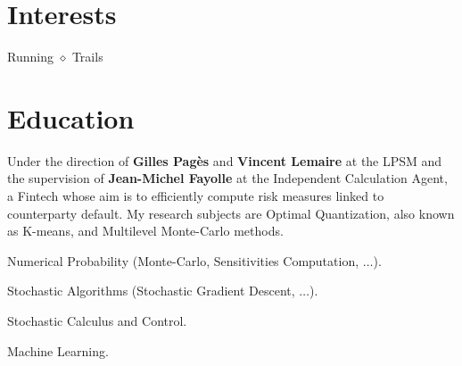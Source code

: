 \documentclass[]{deedy-resume-openfont}
\begin{document}
\begin{minipage}[t]{0.33\textwidth}

\vspace{\topsep}
\vspace{\topsep}
\section{Interests}
Running $\diamond$ Trails

%
%

\end{minipage}
\hfill
\begin{minipage}[t]{0.64\textwidth}



\section{Education}

Under the direction of \textbf{Gilles Pagès} and \textbf{Vincent Lemaire} at the LPSM and the supervision of \textbf{Jean-Michel Fayolle} at the Independent Calculation Agent, a Fintech whose aim is to efficiently compute risk measures linked to counterparty default. My research subjects are Optimal Quantization, also known as K-means, and Multilevel Monte-Carlo methods.
\sectionsep


\vspace{\topsep}
\begin{tightemize}
	\item Numerical Probability (Monte-Carlo, Sensitivities Computation, $\dots$).
	\item Stochastic Algorithms (Stochastic Gradient Descent, $\dots$).
	\item Stochastic Calculus and Control.
	\item Machine Learning.
\end{tightemize}
\sectionsep



\end{minipage}
\end{document}

